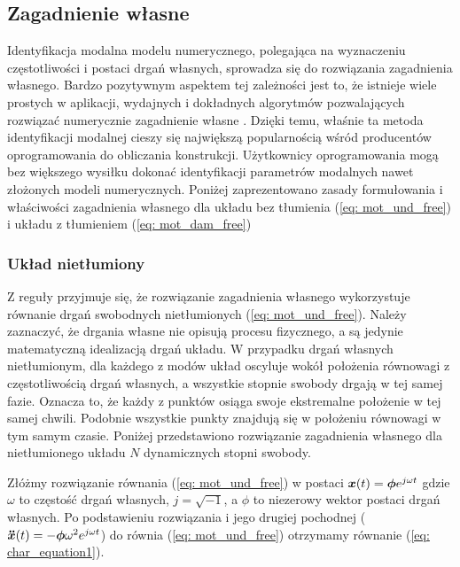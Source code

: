 \subsection{Zagadnienie własne} \label{sect:modal_analysis}
Identyfikacja modalna modelu numerycznego, polegająca na wyznaczeniu częstotliwości i postaci drgań własnych, sprowadza się do rozwiązania zagadnienia własnego. Bardzo pozytywnym aspektem tej zależności jest to, że istnieje wiele prostych w aplikacji, wydajnych i dokładnych algorytmów pozwalających rozwiązać numerycznie zagadnienie własne \parencite{Golub2013}. Dzięki temu, właśnie ta metoda identyfikacji modalnej cieszy się największą popularnością wśród producentów oprogramowania do obliczania konstrukcji. Użytkownicy oprogramowania mogą bez większego wysiłku dokonać identyfikacji parametrów modalnych nawet złożonych modeli numerycznych. Poniżej zaprezentowano zasady formułowania i właściwości zagadnienia własnego dla układu bez tłumienia (\ref{eq: mot_und_free}) i układu z tłumieniem (\ref{eq: mot_dam_free})
\subsubsection{Układ nietłumiony}
Z reguły przyjmuje się, że rozwiązanie zagadnienia własnego wykorzystuje równanie drgań swobodnych nietłumionych (\ref{eq: mot_und_free}). Należy zaznaczyć, że drgania własne nie opisują procesu fizycznego, a są jedynie matematyczną idealizacją drgań układu. W przypadku drgań własnych nietłumionym, dla każdego z modów układ oscyluje wokół położenia równowagi z częstotliwością drgań własnych, a wszystkie stopnie swobody drgają w tej samej fazie. Oznacza to, że każdy z punktów osiąga swoje ekstremalne położenie w tej samej chwili. Podobnie wszystkie punkty znajdują się w położeniu równowagi w tym samym czasie. Poniżej przedstawiono rozwiązanie zagadnienia własnego dla nietłumionego układu $N$ dynamicznych stopni swobody.

Złóżmy rozwiązanie równania (\ref{eq: mot_und_free}) w postaci $\bm{x}(t)=\bm{\phi}e^{j\omega t}$ gdzie $\omega$ to częstość drgań własnych, $j=\sqrt{-1}$, a $\phi$ to niezerowy wektor postaci drgań własnych. Po podstawieniu rozwiązania i jego drugiej pochodnej ($\bm{\ddot{x}}(t)=-\bm{\phi} \omega^2 e^{j\omega t}$) do równia (\ref{eq: mot_und_free}) otrzymamy równanie (\ref{eq: char_equation1}).

